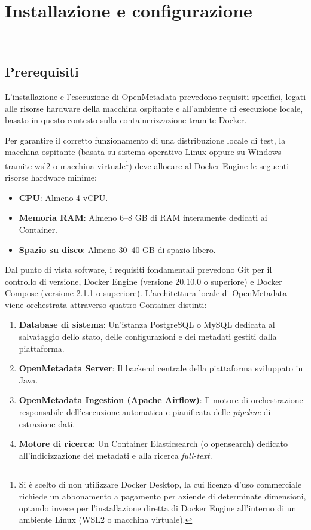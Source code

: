 \chapter{Installazione e configurazione}
\label{cap:installazione}

\\

\section{Prerequisiti}
L'installazione e l'esecuzione di OpenMetadata prevedono requisiti specifici, legati alle risorse hardware della macchina ospitante e 
all'ambiente di esecuzione locale, basato in questo contesto sulla containerizzazione tramite Docker.

Per garantire il corretto funzionamento di una distribuzione locale di test, la macchina ospitante (basata su sistema operativo Linux oppure su Windows 
tramite \gls{wsl}2 o macchina virtuale\footnote{Si è scelto di non utilizzare Docker Desktop, la cui licenza d'uso commerciale richiede un abbonamento a pagamento per aziende di determinate dimensioni, optando invece per l'installazione diretta di Docker Engine all'interno di un ambiente Linux (WSL2 o macchina virtuale).}) deve allocare al Docker Engine le seguenti risorse hardware minime:
\begin{itemize}
    \item \textbf{CPU}: Almeno 4 vCPU.
    \item \textbf{Memoria RAM}: Almeno 6--8 GB di RAM interamente dedicati ai Container.
    \item \textbf{Spazio su disco}: Almeno 30--40 GB di spazio libero.
\end{itemize}

Dal punto di vista software, i requisiti fondamentali prevedono Git per il controllo di versione, Docker Engine (versione 20.10.0 o superiore) e Docker Compose (versione 2.1.1 o superiore). 
L'architettura locale di OpenMetadata viene orchestrata attraverso quattro Container distinti:
\begin{enumerate}
    \item \textbf{Database di sistema}: Un'istanza PostgreSQL o MySQL dedicata al salvataggio dello stato, delle configurazioni e dei metadati gestiti dalla piattaforma.
    \item \textbf{OpenMetadata Server}: Il backend centrale della piattaforma sviluppato in Java.
    \item \textbf{OpenMetadata Ingestion (Apache Airflow)}: Il motore di orchestrazione responsabile dell'esecuzione automatica e pianificata delle \emph{pipeline} di estrazione dati.
    \item \textbf{Motore di ricerca}: Un Container Elasticsearch (o \gls{opensearch}) dedicato all'indicizzazione dei metadati e alla ricerca \emph{full-text}.
\end{enumerate}

